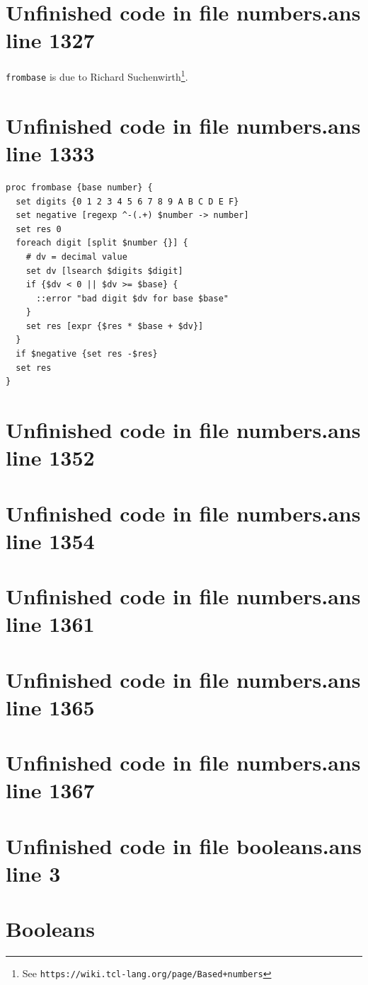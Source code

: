 \documentclass[twoside,9pt]{report}
\begin{document}
\section{Unfinished code in file numbers.ans line 1327}


\texttt{frombase} is due to Richard Suchenwirth\footnote{See \texttt{https://wiki.tcl-lang.org/page/Based+numbers}}.

\section{Unfinished code in file numbers.ans line 1333}
\begin{lstlisting}
proc frombase {base number} {
  set digits {0 1 2 3 4 5 6 7 8 9 A B C D E F}
  set negative [regexp ^-(.+) $number -> number]
  set res 0
  foreach digit [split $number {}] {
    # dv = decimal value
    set dv [lsearch $digits $digit]
    if {$dv < 0 || $dv >= $base} {
      ::error "bad digit $dv for base $base"
    }
    set res [expr {$res * $base + $dv}]
  }
  if $negative {set res -$res}
  set res
}
\end{lstlisting}
\section{Unfinished code in file numbers.ans line 1352}
\section{Unfinished code in file numbers.ans line 1354}
\section{Unfinished code in file numbers.ans line 1361}
\section{Unfinished code in file numbers.ans line 1365}
\section{Unfinished code in file numbers.ans line 1367}
\section{Unfinished code in file booleans.ans line 3}
\section{Booleans}
\label{booleans}
\end{document}
